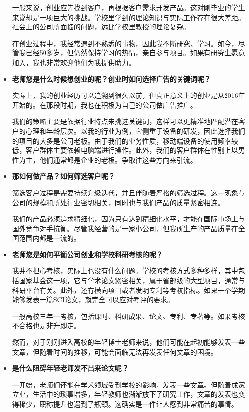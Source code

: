 \begin{itemize}
一般来说，创业应先找到客户，再根据客户需求开发产品。这对刚毕业的学生来说却是一项巨大的挑战。学校里学到的理论知识与实际工作存在很大差距。社会上的公司所面临的问题，远比学校里教授的理论复杂。

在创业过程中，我经常遇到不熟悉的事物，因此我不断研究、学习。如今，尽管我已经50多岁，但仍然保持学习的热情，亲自参与项目。如果有研究生愿意加入，我也非常欢迎他们为我提供助力。

  
    \item \textbf{老师您是什么时候想创业的呢？创业时如何选择广告的关键词呢？}
    
实际上，我的创业经历可以追溯到很久以前，但真正意义上的创业是从2016年开始的。在那段时期，我也在积极为自己的公司做广告推广。


我们的策略主要是依据行业特点来挑选关键词，这样可以更精准地匹配潜在客户的心理和年龄层次。以我的行业为例，它侧重于设备的研发，因此选择我们的项目的大多是公司老板。由于我们的业务性质，移动端设备的使用频率较低，客户群体主要依赖电脑端进行操作。此外，我们的客户群体在性别上以男性为主，他们通常都是企业的老板。争取往这些方向来引流。

    \item \textbf{那如何做产品？如何筛选客户呢？}

筛选客户过程是需要持续升级迭代，并且伴随着严格的筛选过程。这一现象与公司的规模和所处行业密切相关，同时也与我们产品的质量紧密相连。

我们的产品必须追求精细化，因为只有达到精细化水平，才能在国际市场上与国外竞争对手抗衡。尽管我经营的是一家小公司，但我所生产的产品质量在全国范围内都是一流的。

    \item \textbf{老师您是如何平衡公司创业和学校科研考核的呢？}

我并不担心考核，实际上也没有什么问题。学校的考核方式多种多样，其中包括国家基金这一项，它与学术论文紧密相关，属于省部级的大型项目，通常与科研平台有关。此外，还有横向项目或者发明专利等考核指标。如果一个学期能够发表一篇SCI论文，就完全可以应对考评的要求。

一般高校三年一考核，包括课时、科研成果、论文、专利、专著等。如果考核不合格也是非升即走。

然而，对于刚刚进入高校的年轻博士老师来说，他们可能在起初能够发表一些文章，但随着时间的推移，可能会面临无法再发表任何文章的困境。


    \item \textbf{是什么阻碍年轻老师发不出来论文呢？}

一开始，老师们还能在学术领域受到学校的影响，发表一些文章。但随着成家立业，生活中的琐事增多，年轻教师也渐渐放下了研究工作，文章的发表也变得稀少，职称提升也遇到了瓶颈。这确实是一件让人感到非常痛苦的事情。


\end{itemize}
